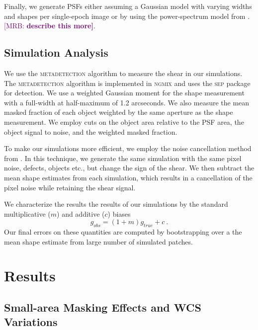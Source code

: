 \documentclass[twocolappendix, appendixfloats, numberedappendix, twocolumn, apj]{openjournal}
\newcommand{\mrb}[1]{\textcolor{purple}{[MRB: \bf #1]}\xspace}
\newcommand{\mdet}{\textsc{metadetection}\xspace}
\newcommand{\ngmix}{\textsc{ngmix}\xspace}
\newcommand{\sep}{\textsc{sep}\xspace}
\begin{document}
Finally, we generate PSFs either assuming a Gaussian model with varying widths and shapes
per single-epoch image or by using the power-spectrum model from \citep{mdet}. \mrb{describe this more}.

\subsection{Simulation Analysis}

We use the \mdet algorithm to measure the shear in our simulations. The \mdet algorithm is implemented in
\ngmix and uses the \sep package \citep{sep} for detection. We use a weighted Gaussian moment for the shape
measurement with a full-width at half-maximum of 1.2 arcseconds. We also measure the mean masked fraction
of each object weighted by the same aperture as the shape measurement. We employ cuts on the object area relative to
the PSF area, the object signal to noise, and the weighted masked fraction.

To make our simulations more efficient, we employ the noise cancellation method from \citet{pujol2019}. In this technique,
we generate the same simulation with the same pixel noise, defects, objects etc., but change the sign of
the shear. We then subtract the mean shape estimates from each simulation, which results in a cancellation of
the pixel noise while retaining the shear signal.

We characterize the results the results of our simulations by the standard multiplicative ($m$) and additive ($c$) biases
\begin{equation}
g_{obs} = (1+m)g_{true} + c\ .
\end{equation}
Our final errors on these quantities are computed by bootstrapping over a the mean shape estimate from large
number of simulated patches.

\section{Results}\label{sec:results}

\subsection{Small-area Masking Effects and WCS Variations}
\end{document}
